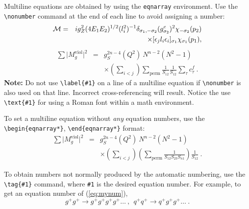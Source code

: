\documentclass[%
 reprint,
 amsmath,amssymb,
 aps,
]{revtex4-2}
\begin{document}
Multiline equations are obtained by using the \verb+eqnarray+
environment.  Use the \verb+\nonumber+ command at the end of each line
to avoid assigning a number:
\begin{eqnarray}
  {\cal M}=&&ig_Z^2(4E_1E_2)^{1/2}(l_i^2)^{-1}
  \delta_{\sigma_1,-\sigma_2}
  (g_{\sigma_2}^e)^2\chi_{-\sigma_2}(p_2)\nonumber\\
           &&\times
           [\epsilon_jl_i\epsilon_i]_{\sigma_1}\chi_{\sigma_1}(p_1),
\end{eqnarray}
\begin{eqnarray}
  \sum \vert M^{\text{viol}}_g \vert ^2&=&g^{2n-4}_S(Q^2)~N^{n-2}
  (N^2-1)\nonumber \\
                                       & &\times \left( \sum_{i<j}\right)
                                       \sum_{\text{perm}}
                                       \frac{1}{S_{12}}
                                       \frac{1}{S_{12}}
                                       \sum_\tau c^f_\tau~.
\end{eqnarray}
\textbf{Note:} Do not use \verb+\label{#1}+ on a line of a multiline
equation if \verb+\nonumber+ is also used on that line. Incorrect
cross-referencing will result. Notice the use \verb+\text{#1}+ for
using a Roman font within a math environment.

To set a multiline equation without \emph{any} equation
numbers, use the \verb+\begin{eqnarray*}+,
\verb+\end{eqnarray*}+ format:
\begin{eqnarray*}
  \sum \vert M^{\text{viol}}_g \vert ^2&=&g^{2n-4}_S(Q^2)~N^{n-2}
  (N^2-1)\\
                                       & &\times \left( \sum_{i<j}\right)
                                       \left(
                                         \sum_{\text{perm}}\frac{1}{S_{12}S_{23}S_{n1}}
                                       \right)
                                       \frac{1}{S_{12}}~.
\end{eqnarray*}

To obtain numbers not normally produced by the automatic numbering,
use the \verb+\tag{#1}+ command, where \verb+#1+ is the desired
equation number. For example, to get an equation number of
(\ref{eq:mynum}),
\begin{equation}
  g^+g^+ \rightarrow g^+g^+g^+g^+ \dots ~,~~q^+q^+\rightarrow
  q^+g^+g^+ \dots ~. \tag{2.6$'$}\label{eq:mynum}
\end{equation}
\end{document}
